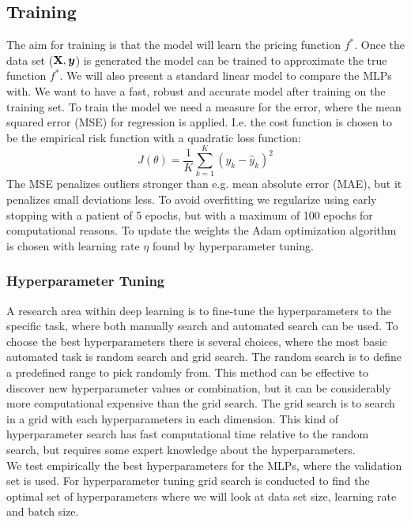 \subsection{Training}\label{Training}
The aim for training is that the model will learn the pricing function $f^*$. Once the data set ($\mathbf{X}, \bm{y}$) is generated the model can be trained to approximate the true function $f^*$. We will also present a standard linear model to compare the MLPs with. We want to have a fast, robust and accurate model after training on the training set. To train the model we need a measure for the error, where the mean squared error (MSE) for regression is applied. I.e. the cost function is chosen to be the empirical risk function with a quadratic loss function:
$$J(\theta)= \frac{1}{K} \sum_{k=1}^{K}(y_k-\hat{y}_k)^2$$
The MSE penalizes outliers stronger than e.g. mean absolute error (MAE), but it penalizes small deviations less. To avoid overfitting we regularize using early stopping with a patient of 5 epochs, but with a maximum of 100 epochs for computational reasons. To update the weights the Adam optimization algorithm is chosen with learning rate $\eta$ found by hyperparameter tuning. \\

\subsubsection{Hyperparameter Tuning}
A research area within deep learning is to fine-tune the hyperparameters to the specific task, where both manually search and automated search can be used. To choose the best hyperparameters there is several choices, where the most basic automated task is random search and grid search. The random search is to define a predefined range to pick randomly from. This method can be effective to discover new hyperparameter values or combination, but it can be considerably more computational expensive than the grid search. The grid search is to search in a grid with each hyperparameters in each dimension. This kind of hyperparameter search has fast computational time relative to the random search, but requires some expert knowledge about the hyperparameters.\\

We test empirically the best hyperparameters for the MLPs, where the validation set is used. For hyperparameter tuning grid search is conducted to find the optimal set of hyperparameters where we will look at data set size, learning rate and batch size. \\

